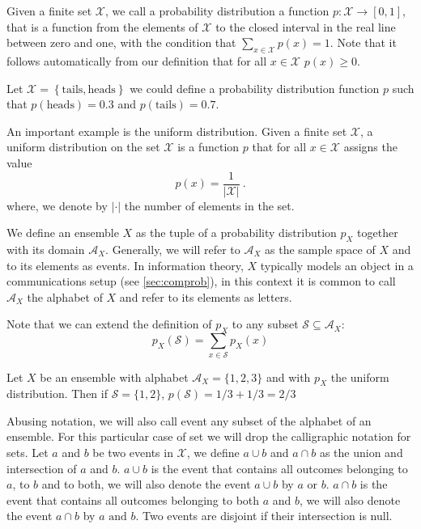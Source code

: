 Given a finite set $\mathcal X$, we call a probability distribution a function $p:\mathcal X\rightarrow[0,1]$, that is a function from the elements of $\mathcal X$ to the closed interval in the real line between zero and one, with the condition that $\sum_{x\in\mathcal X}p(x)=1$. 
Note that it follows automatically from our definition that for all $x\in\mathcal X$ $p(x)\geq 0$. 
\begin{example} Let $\mathcal X =\left\{\text{tails},\text{heads}\right\}$ we could define a probability distribution function $p$ such that $p(\text{heads})=0.3$ and $p(\text{tails})=0.7$.
\end{example}
\begin{example} An important example is the uniform distribution. Given a finite set $\mathcal X$, a uniform distribution on the set $\mathcal X$ is a function $p$ that for all $x\in\mathcal X$ assigns the value $$p(x)=\frac{1}{|\mathcal{X}|}\ .$$ where, we denote by $|\cdot|$ the number of elements in the set.
\end{example}
We define an ensemble $X$ as the tuple of a probability distribution $p_{X}$ together with its domain $\mathcal A_X$. 
Generally, we will refer to $\mathcal A_X$ as the sample space of $X$ and to its elements as events. %
In information theory, $X$ typically models an object in a communications setup (see \ref{sec:comprob}), in this context it is common to call $\mathcal A_X$ the alphabet of $X$ and refer to its elements as letters. %

Note that we can extend the definition of $p_{X}$ to any subset $\mathcal{S}\subseteq \mathcal{A}_X$:
\begin{equation}
p_{X}(\mathcal{S})=\sum_{x\in \mathcal{S}}p_{X}(x)
\end{equation} 
\begin{example}
Let $X$ be an ensemble with alphabet $\mathcal A_{X}=\{1,2,3\}$ and with $p_{X}$ the uniform distribution. Then if $\mathcal S=\{1,2\}$, $p(\mathcal S)=1/3+1/3=2/3$ 
\end{example}
Abusing notation, we will also call event any subset of the alphabet of an ensemble. For this particular case of set we will drop the calligraphic notation for sets.
Let $a$ and $b$ be two events in $\mathcal{X}$, we define $a\cup b$ and $a\cap b$ as the union and intersection of $a$ and $b$. 
$a\cup b$ is the event that contains all outcomes belonging to $a$, to $b$ and to both, we will also denote the event $a\cup b$ by $a \text{ or } b$. 
$a\cap b$ is the event that contains all outcomes belonging to both $a$ and $b$, we will also denote the event $a\cap b$ by $a \text{ and } b$. Two events are disjoint if their intersection is null.

